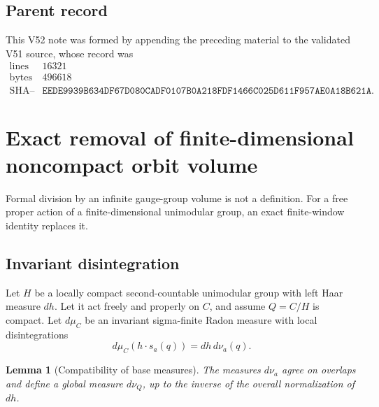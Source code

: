 \documentclass[11pt]{article}
\newtheorem{lemma}[theorem]{Lemma}
\begin{document}
\subsection{Parent record}

This V52 note was formed by appending the preceding material to the
validated V51 source, whose record was
\[
\begin{array}{c|c}
\text{lines}&16321\\
\text{bytes}&496618\\
\text{SHA--256}&
\texttt{EEDE9939B634DF67D080CADF0107B0A218FDF1466C025D611F957AE0A18B621A}.
\end{array}                                                     \tag{52.20}
\]


\section{Exact removal of finite-dimensional noncompact orbit volume}
\label{sec:v11v53}

Formal division by an infinite gauge-group volume is not a definition.
For a free proper action of a finite-dimensional unimodular group, an
exact finite-window identity replaces it.

\subsection{Invariant disintegration}

Let \(H\) be a locally compact second-countable unimodular group with
left Haar measure \(dh\).  Let it act freely and properly on \(C\), and
assume \(Q=C/H\) is compact.  Let \(d\mu_C\) be an invariant
sigma-finite Radon measure with local disintegrations
\[
 d\mu_C(h\cdot s_a(q))=dh\,d\nu_a(q).                         \tag{53.1}
\]

\begin{lemma}[Compatibility of base measures]
\label{lem:v11v53-base}
The measures \(d\nu_a\) agree on overlaps and define a global measure
\(d\nu_Q\), up to the inverse of the overall normalization of \(dh\).
\end{lemma}
\end{document}
